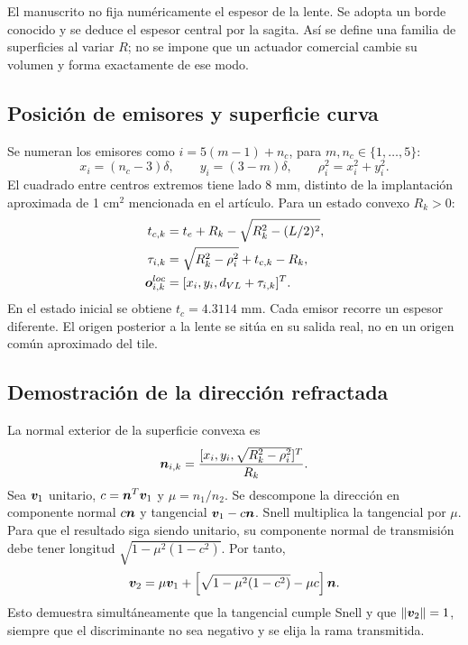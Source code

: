 El manuscrito no fija numéricamente el espesor de la lente. Se adopta un borde conocido y se deduce el espesor central por la sagita. Así se define una familia de superficies al variar $R$; no se impone que un actuador comercial cambie su volumen y forma exactamente de ese modo.

\subsection{Posición de emisores y superficie curva}
Se numeran los emisores como $i=5(m-1)+n_c$, para $m,n_c\in\{1,\ldots,5\}$:
\begin{equation}
x_i=(n_c-3)\delta,\qquad y_i=(3-m)\delta,\qquad \rho_i^2=x_i^2+y_i^2.
\end{equation}
El cuadrado entre centros extremos tiene lado 8 mm, distinto de la implantación aproximada de 1 cm$^2$ mencionada en el artículo. Para un estado convexo $R_k>0$:
\begin{align}
t_{c,k}&=t_e+R_k-\sqrt{R_k^2-(L/2)^2},\\
\tau_{i,k}&=\sqrt{R_k^2-\rho_i^2}+t_{c,k}-R_k,\\
\bm{o}_{i,k}^{loc}&=[x_i,y_i,d_{VL}+\tau_{i,k}]^T.
\end{align}
En el estado inicial se obtiene $t_c=4.3114$ mm. Cada emisor recorre un espesor diferente. El origen posterior a la lente se sitúa en su salida real, no en un origen común aproximado del tile.

\subsection{Demostración de la dirección refractada}
La normal exterior de la superficie convexa es
\begin{equation}
\bm{n}_{i,k}=\frac{[x_i,y_i,\sqrt{R_k^2-\rho_i^2}]^T}{R_k}.
\end{equation}
Sea $\bm{v}_1$ unitario, $c=\bm{n}^T\bm{v}_1$ y $\mu=n_1/n_2$. Se descompone la dirección en componente normal $c\bm{n}$ y tangencial $\bm{v}_1-c\bm{n}$. Snell multiplica la tangencial por $\mu$. Para que el resultado siga siendo unitario, su componente normal de transmisión debe tener longitud $\sqrt{1-\mu^2(1-c^2)}$. Por tanto,
\begin{equation}\label{eq:snell}
\bm{v}_2=\mu\bm{v}_1+
\left[\sqrt{1-\mu^2(1-c^2)}-\mu c\right]\bm{n}.
\end{equation}
Esto demuestra simultáneamente que la tangencial cumple Snell y que $\|\bm{v}_2\|=1$, siempre que el discriminante no sea negativo y se elija la rama transmitida.

